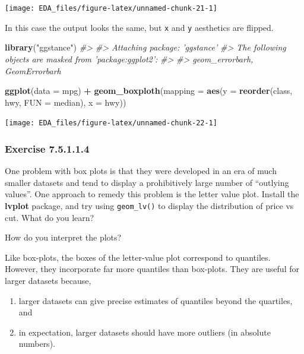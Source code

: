 \documentclass[]{book}
\newenvironment{Shaded}{\begin{snugshade}}{\end{snugshade}}
\newcommand{\CommentTok}[1]{\textcolor[rgb]{0.56,0.35,0.01}{\textit{#1}}}
\newcommand{\DataTypeTok}[1]{\textcolor[rgb]{0.13,0.29,0.53}{#1}}
\newcommand{\KeywordTok}[1]{\textcolor[rgb]{0.13,0.29,0.53}{\textbf{#1}}}
\newcommand{\NormalTok}[1]{#1}
\newcommand{\OperatorTok}[1]{\textcolor[rgb]{0.81,0.36,0.00}{\textbf{#1}}}
\newcommand{\StringTok}[1]{\textcolor[rgb]{0.31,0.60,0.02}{#1}}
\providecommand{\tightlist}{%
  \setlength{\itemsep}{0pt}\setlength{\parskip}{0pt}}
\theoremstyle{plain}
\theoremstyle{remark}
\begin{document}
\begin{center}\texttt{[image: EDA\_files/figure-latex/unnamed-chunk-21-1]} \end{center}

In this case the output looks the same, but \texttt{x} and \texttt{y} aesthetics are flipped.

\begin{Shaded}
\begin{Highlighting}[]
\KeywordTok{library}\NormalTok{(}\StringTok{"ggstance"}\NormalTok{)}
\CommentTok{#> }
\CommentTok{#> Attaching package: 'ggstance'}
\CommentTok{#> The following objects are masked from 'package:ggplot2':}
\CommentTok{#> }
\CommentTok{#>     geom_errorbarh, GeomErrorbarh}

\KeywordTok{ggplot}\NormalTok{(}\DataTypeTok{data =}\NormalTok{ mpg) }\OperatorTok{+}
\StringTok{  }\KeywordTok{geom_boxploth}\NormalTok{(}\DataTypeTok{mapping =} \KeywordTok{aes}\NormalTok{(}\DataTypeTok{y =} \KeywordTok{reorder}\NormalTok{(class, hwy, }\DataTypeTok{FUN =}\NormalTok{ median), }\DataTypeTok{x =}\NormalTok{ hwy))}
\end{Highlighting}
\end{Shaded}

\begin{center}\texttt{[image: EDA\_files/figure-latex/unnamed-chunk-22-1]} \end{center}

\hypertarget{exercise-7.5.1.1.4}{%
\subsubsection*{\texorpdfstring{Exercise {7.5.1.1.4}}{Exercise 7.5.1.1.4}}\label{exercise-7.5.1.1.4}}

One problem with box plots is that they were developed in an era of much smaller datasets and tend to display a prohibitively large number of ``outlying values''.
One approach to remedy this problem is the letter value plot.
Install the \textbf{lvplot} package, and try using \texttt{geom\_lv()} to display the distribution of price vs cut.
What do you learn?

How do you interpret the plots?

Like box-plots, the boxes of the letter-value plot correspond to quantiles. However, they incorporate
far more quantiles than box-plots. They are useful for larger datasets because,

\begin{enumerate}
\def\labelenumi{\arabic{enumi}.}
\tightlist
\item
  larger datasets can give precise estimates of quantiles beyond the quartiles, and
\item
  in expectation, larger datasets should have more outliers (in absolute numbers).
\end{enumerate}
\end{document}
